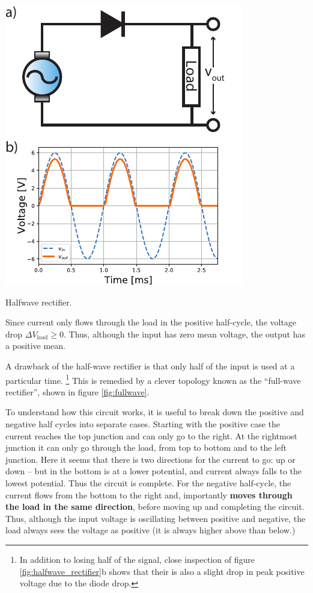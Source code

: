 \documentclass{tufte-book}
\begin{document}
\begin{marginfigure}
  \includegraphics[]{halfwave}
  \caption{Halfwave rectifier.}
  \label{fig:halfwave_rectifier}
\end{marginfigure}

Since current only flows through the load in the positive half-cycle, the voltage drop $\Delta V_\text{load} \ge 0$. Thus, although the input has zero mean voltage, the output has a positive mean. 

A drawback of the half-wave rectifier is that only half of the input is used at a particular time. \footnote{In addition to losing half of the signal, close inspection of figure \ref{fig:halfwave_rectifier}b shows that their is also a slight drop in peak positive voltage due to the diode drop.} This is remedied by a clever topology known as the ``full-wave rectifier'', shown in figure \ref{fig:fullwave}.

 To understand how this circuit works, it is useful to break down the positive and negative half cycles into separate cases. Starting with the positive case the current reaches the top junction and can only go to the right. At the rightmost junction it can only go through the load, from top to bottom and to the left junction. Here it seems that there is two directions for the current to go: up or down -- but in the bottom is at a lower potential, and current always falls to the lowest potential. Thus the circuit is complete. For the negative half-cycle, the current flows from the bottom to the right and, importantly \textbf{moves through the load in the same direction}, before moving up and completing the circuit. Thus, although the input voltage is oscillating between positive and negative, the load always sees the voltage as positive (it is always higher above than below.)
\end{document}
